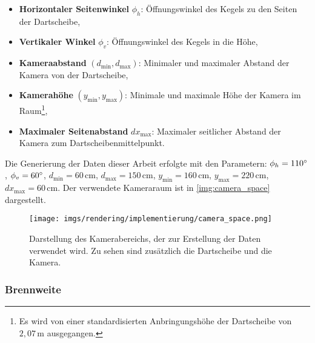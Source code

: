 \begin{itemize}
    \item \textbf{Horizontaler Seitenwinkel} $\phi_h$: Öffnungswinkel des Kegels zu den Seiten der Dartscheibe,
    \item \textbf{Vertikaler Winkel} $\phi_v$: Öffnungswinkel des Kegels in die Höhe,
    \item \textbf{Kameraabstand} $\left(d_\text{min}, d_\text{max}\right)$: Minimaler und maximaler Abstand der Kamera von der Dartscheibe,
    \item \textbf{Kamerahöhe} $\left(y_\text{min}, y_\text{max}\right)$: Minimale und maximale Höhe der Kamera im Raum\footnote{Es wird von einer standardisierten Anbringungshöhe der Dartscheibe von $2,07\,\text{m}$ ausgegangen.},
    \item \textbf{Maximaler Seitenabstand} $dx_\text{max}$: Maximaler seitlicher Abstand der Kamera zum Dartscheibenmittelpunkt.
\end{itemize}

Die Generierung der Daten dieser Arbeit erfolgte mit den Parametern: $\phi_h = 110^{\circ}$, $\phi_v = 60^{\circ}$, $d_\text{min} = 60\,\text{cm}$, $d_\text{max} = 150\,\text{cm}$, $y_\text{min} = 160\,\text{cm}$, $y_\text{max} = 220\,\text{cm}$, $dx_\text{max} = 60\,\text{cm}$. Der verwendete Kameraraum ist in \autoref{img:camera_space} dargestellt.

\begin{figure}
    \centering
    \texttt{[image: imgs/rendering/implementierung/camera\_space.png]}
    \caption{Darstellung des Kamerabereichs, der zur Erstellung der Daten verwendet wird. Zu sehen sind zusätzlich die Dartscheibe und die Kamera.}
    \label{img:camera_space}
\end{figure}

\subsubsection{Brennweite}
\label{sec:brennweite}

